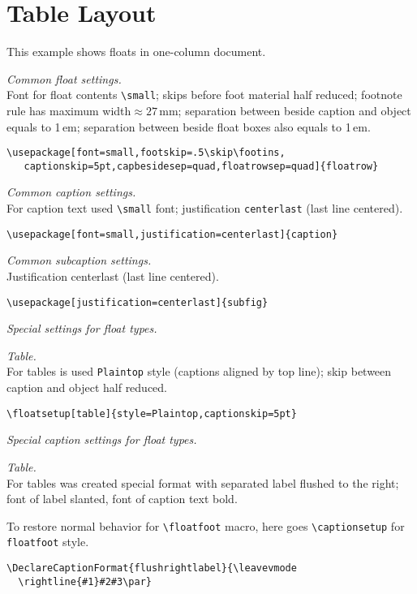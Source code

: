 \documentclass{book}
\begin{document}
\chapter{Table Layout}

\begin{sl}
This example shows floats in one-column document.

\emph{Common float settings.}\\
Font for float contents \verb|\small|; skips before foot material half reduced;
footnote rule has maximum width${{}\approx27}$\,mm; separation between
beside caption and object equals to 1\,em; separation between beside float
boxes also equals to 1\,em.
\begin{verbatim}
\usepackage[font=small,footskip=.5\skip\footins,
   captionskip=5pt,capbesidesep=quad,floatrowsep=quad]{floatrow}
\end{verbatim}

\emph{Common caption settings.}\\
For caption text used \verb|\small| font;
justification \texttt{centerlast} (last line centered).
\begin{verbatim}
\usepackage[font=small,justification=centerlast]{caption}
\end{verbatim}

\emph{Common subcaption settings.}\\
Justification centerlast (last line centered).
\begin{verbatim}
\usepackage[justification=centerlast]{subfig}
\end{verbatim}

\emph{Special settings for float types.}

\emph{Table.}\\
For tables is used \texttt{Plaintop} style (captions aligned by top line);
skip between caption and object  half reduced.
\begin{verbatim}
\floatsetup[table]{style=Plaintop,captionskip=5pt}
\end{verbatim}

\emph{Special caption settings for float types.}

\emph{Table.}\\
For tables was created special format with separated label flushed to the right;
font of label slanted, font of caption text bold.

To restore normal behavior for \verb|\floatfoot| macro, here goes \verb|\captionsetup|
for \texttt{floatfoot} style.
\begin{verbatim}
\DeclareCaptionFormat{flushrightlabel}{\leavevmode
  \rightline{#1}#2#3\par}


\end{verbatim}
\end{sl}
\end{document}
